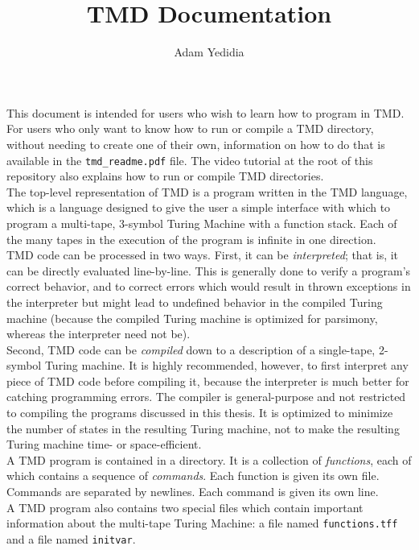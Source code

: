 \documentclass[11pt]{article}
\title{TMD Documentation}
\author{Adam Yedidia}
\begin{document}
    
\maketitle

This document is intended for users who wish to learn how to program in TMD. For users who only want to know how to run or compile a TMD directory, without needing to create one of their own, information on how to do that is available in the \texttt{tmd_readme.pdf} file. The video tutorial at the root of this repository also explains how to run or compile TMD directories. \\

The top-level representation of TMD is a program written in the TMD language, which is a language designed to give the user a simple interface with which to program a multi-tape, 3-symbol Turing Machine with a function stack. Each of the many tapes in the execution of the program is infinite in one direction. \\

TMD code can be processed in two ways. First, it can be \emph{interpreted}; that is, it can be directly evaluated line-by-line. This is generally done to verify a program's correct behavior, and to correct errors which would result in thrown exceptions in the interpreter but might lead to undefined behavior in the compiled Turing machine (because the compiled Turing machine is optimized for parsimony, whereas the interpreter need not be). \\

Second, TMD code can be \emph{compiled} down to a description of a single-tape, 2-symbol Turing machine. It is highly recommended, however, to first interpret any piece of TMD code before compiling it, because the interpreter is much better for catching programming errors. The compiler is general-purpose and not restricted to compiling the programs discussed in this thesis. It is optimized to minimize the number of states in the resulting Turing machine, not to make the resulting Turing machine time- or space-efficient. \\

A TMD program is contained in a directory. It is a collection of \emph{functions}, each of which contains a sequence of \emph{commands}. Each function is given its own file. Commands are separated by newlines. Each command is given its own line. \\

A TMD program also contains two special files which contain important information about the multi-tape Turing Machine: a file named {\tt functions.tff} and a file named {\tt initvar}. \\ 
\end{document}
